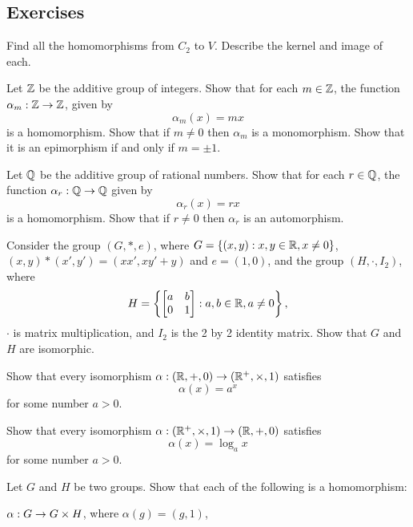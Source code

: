 \subsection*{Exercises}

\begin{exercises}
  \item Find all the homomorphisms from $C_{2}$ to $V$.  Describe the 
    kernel and image of each.
  
  \item Let $\mathbb{Z}$ be the additive group of integers.  Show that 
  for each $m \in \mathbb{Z}$, the function $\alpha_{m} : \mathbb{Z} 
  \to \mathbb{Z}$, given by
  \[
    \alpha_{m}(x) = mx
  \]
  is a homomorphism.  Show that if $m \ne 0$ then $\alpha_{m}$ is a 
  monomorphism.  Show that it is an epimorphism if and only if $m = 
  \pm 1$.
  
  \item Let $\mathbb{Q}$ be the additive group of rational numbers.  Show that 
  for each $r \in \mathbb{Q}$, the function $\alpha_{r}: \mathbb{Q} 
  \to \mathbb{Q}$ given by
  \[
    \alpha_{r}(x) = rx
  \]
  is a homomorphism.  Show that if $r \ne 0$ then $\alpha_{r}$ is an 
  automorphism.
  
  \item Consider the group $(G, \ast, e)$, where $G = \{(x,y) : x,y
    \in \mathbb{R}, x \ne 0\}$, $(x,y) \ast (x',y') = (xx', xy' + y)$ and $e =
    (1,0)$, and the group $(H, \cdot, I_{2})$, where
    \[
      H = \left\{\begin{bmatrix}
        a & b \\
0 & 1
      \end{bmatrix} : a, b \in \mathbb{R}, a \ne 0 \right\},
    \]
    $\cdot$ is matrix multiplication, and $I_{2}$ is the 2 by 2 
    identity matrix.  Show that $G$ and $H$ are isomorphic.
  
  \item Show that every isomorphism $\alpha : (\mathbb{R}, +, 0) \to 
    (\mathbb{R}^{+}, \times, 1)$ satisfies
    \[
      \alpha(x) = a^{x}
    \]
    for some number $a > 0$.
    
    Show that every isomorphism $\alpha : (\mathbb{R}^{+}, \times, 1) \to 
    (\mathbb{R}, +, 0)$ satisfies
    \[
      \alpha(x) = \log_{a} x
    \]
    for some number $a > 0$.
  
  \item\label{ex:directprodhoms} Let $G$ and $H$ be two groups. 
    Show that each of the following is a homomorphism:
    \begin{theoremenum}
      \item $\alpha: G \to G \times H$, where $\alpha(g) = (g,1)$,


\end{theoremenum}
\end{exercises}
